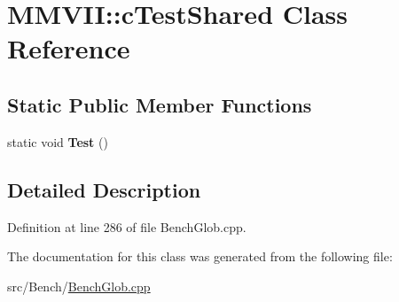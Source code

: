 \hypertarget{classMMVII_1_1cTestShared}{}\section{M\+M\+V\+II\+:\+:c\+Test\+Shared Class Reference}
\label{classMMVII_1_1cTestShared}
\subsection*{Static Public Member Functions}
\begin{DoxyCompactItemize}
\item 
static void {\bfseries Test} ()\hypertarget{classMMVII_1_1cTestShared_a96691966d5ff642a828cd3224732a53a}{}\label{classMMVII_1_1cTestShared_a96691966d5ff642a828cd3224732a53a}

\end{DoxyCompactItemize}


\subsection{Detailed Description}


Definition at line 286 of file Bench\+Glob.\+cpp.



The documentation for this class was generated from the following file\+:\begin{DoxyCompactItemize}
\item 
src/\+Bench/\hyperlink{BenchGlob_8cpp}{Bench\+Glob.\+cpp}\end{DoxyCompactItemize}
